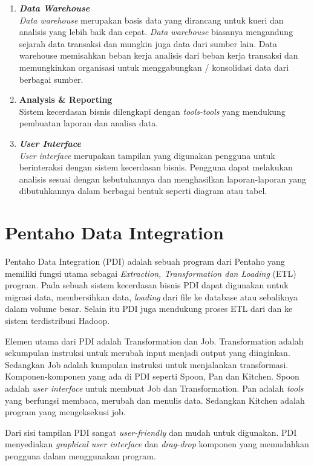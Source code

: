 \begin{enumerate}
	\item \textbf{\textit{Data Warehouse}}\\
	\textit{Data warehouse} merupakan basis data yang dirancang untuk kueri dan analisis yang lebih baik dan cepat. \textit{Data warehouse} biasanya mengandung sejarah data transaksi dan mungkin juga data dari sumber lain. Data warehouse memisahkan beban kerja analisis dari beban kerja transaksi dan memungkinkan organisasi untuk menggabungkan / konsolidasi data dari berbagai sumber.
	
	\item \textbf{Analysis \& Reporting}\\
	Sistem kecerdasan bisnis dilengkapi dengan \textit{tools-tools} yang mendukung pembuatan laporan dan analisa data.
	
	\item \textbf{\textit{User Interface}}\\
	\textit{User interface} merupakan tampilan yang digunakan pengguna untuk berinteraksi dengan sistem kecerdasan bisnis. Pengguna dapat melakukan analisis sesuai dengan kebutuhannya dan menghasilkan laporan-laporan yang dibutuhkannya dalam berbagai bentuk seperti diagram atau tabel.
\end{enumerate} 

\section{Pentaho Data Integration}
Pentaho Data Integration (PDI) adalah sebuah program dari Pentaho yang memiliki fungsi utama sebagai \textit{Extraction, Transformation dan Loading} (ETL) program. Pada sebuah sistem kecerdasan bisnis PDI dapat digunakan untuk migrasi data, membersihkan data, \textit{loading} dari file ke database atau sebaliknya dalam volume besar. Selain itu PDI juga mendukung proses ETL dari dan ke sistem terdistribusi Hadoop. 

Elemen utama dari PDI adalah Transformation dan Job. Transformation adalah sekumpulan instruksi untuk merubah input menjadi output yang diinginkan. Sedangkan Job adalah kumpulan instruksi untuk menjalankan transformasi. Komponen-komponen yang ada di PDI seperti Spoon, Pan dan Kitchen. Spoon adalah \textit{user interface} untuk membuat Job dan Transformation. Pan adalah \textit{tools} yang berfungsi membaca, merubah dan menulis data. Sedangkan Kitchen adalah program yang mengeksekusi job. 

Dari sisi tampilan PDI sangat \textit{user-friendly} dan mudah untuk digunakan. PDI menyediakan \textit{graphical user interface} dan \textit{drag-drop} komponen yang memudahkan pengguna dalam menggunakan program.

